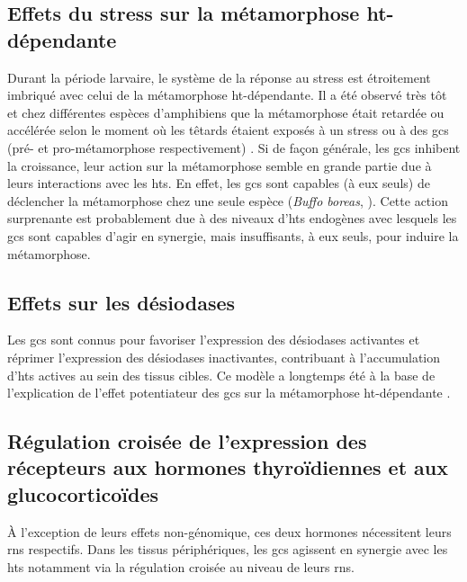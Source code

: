 \documentclass[../main.tex]{subfiles}
\begin{document}


\subsection{Effets du stress sur la métamorphose \gls{ht}-dépendante}
Durant la période larvaire, le système de la réponse au stress est étroitement imbriqué avec celui de la métamorphose \gls{ht}-dépendante.
Il a été observé très tôt et chez différentes espèces d'amphibiens que la métamorphose était retardée ou accélérée selon le moment où les têtards étaient exposés à un stress ou à des \glspl{gc} (pré- et pro-métamorphose respectivement) \citep{Kobayashi1958,Kikuyama1983}.
Si de façon générale, les \glspl{gc} inhibent la croissance, leur action sur la métamorphose semble en grande partie due à leurs interactions avec les \glspl{ht}.
En effet, les \glspl{gc} sont capables (à eux seuls) de déclencher la métamorphose chez une seule espèce (\textit{Buffo boreas}, \citealp{Hayes1993a}).
Cette action surprenante est probablement due à des niveaux d'\glspl{ht} endogènes avec lesquels les \glspl{gc} sont capables d'agir en synergie, mais insuffisants, à eux seuls, pour induire la métamorphose.

\subsection{Effets sur les désiodases}
Les \glspl{gc} sont connus pour favoriser l'expression des désiodases activantes et réprimer l'expression des désiodases inactivantes, contribuant à l'accumulation d'\glspl{ht} actives au sein des tissus cibles.
Ce modèle a longtemps été à la base de l'explication de l'effet potentiateur des \glspl{gc} sur la métamorphose \gls{ht}-dépendante \citep{Galton1990}.

\subsection{Régulation croisée de l'expression des récepteurs aux hormones thyroïdiennes et aux glucocorticoïdes}
À l'exception de leurs effets non-génomique, ces deux hormones nécessitent leurs \glspl{rn} respectifs.
Dans les tissus périphériques, les \glspl{gc} agissent en synergie avec les \glspl{ht} notamment via la régulation croisée au niveau de leurs \glspl{rn}.
\end{document}
